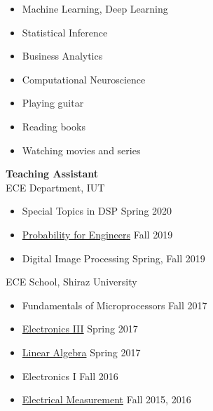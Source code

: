
\vspace{0.5mm}
\begin{itemize}
\item Machine Learning, Deep Learning
\item Statistical Inference
\item Business Analytics
\item Computational Neuroscience
\end{itemize}

\divider

\begin{itemize}
\item Playing guitar
\item Reading books
\item Watching movies and series
\end{itemize}


\vspace{4mm}

\textbf{Teaching Assistant} \\
\vspace{2mm}
ECE Department, IUT \\
\vspace{2mm}
\begin{itemize}
\item Special Topics in DSP \hfill  Spring 2020
\item \href{https://msamsami.ece.iut.ac.ir/content/engineering-probability}{Probability for Engineers} \hfill Fall 2019
\item Digital Image Processing \hfill Spring, Fall 2019
\end{itemize}

\vspace{4mm}
ECE School, Shiraz University \\
\vspace{2mm}
\begin{itemize}
\item Fundamentals of Microprocessors \hfill  Fall 2017
\item \href{https://msamsami.ece.iut.ac.ir/content/electronics-iii}{Electronics III} \hfill Spring 2017
\item \href{https://msamsami.ece.iut.ac.ir/content/linear-algebra}{Linear Algebra} \hfill Spring 2017
\item Electronics I \hfill Fall 2016
\item \href{https://msamsami.ece.iut.ac.ir/content/electrical-measurement}{Electrical Measurement} \hfill Fall 2015, 2016
\end{itemize}


